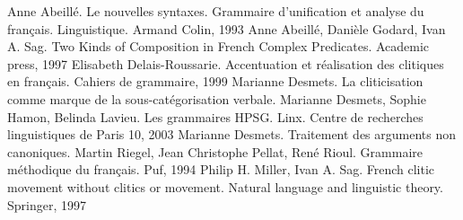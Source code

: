 \begin{thebibliography}{}

\bibitem[Abe93]{} Anne Abeillé. Le nouvelles syntaxes. Grammaire d'unification et analyse du français. Linguistique. Armand Colin, 1993
\bibitem[Abe97]{} Anne Abeillé, Danièle Godard, Ivan A. Sag. Two Kinds of Composition in French Complex Predicates. Academic press, 1997
\bibitem[Del99]{} Elisabeth Delais-Roussarie. Accentuation et réalisation des clitiques en français. Cahiers de grammaire, 1999
\bibitem[DesC]{} Marianne Desmets. La cliticisation comme marque de la sous-catégorisation verbale.
\bibitem[Des03]{} Marianne Desmets, Sophie Hamon, Belinda Lavieu. Les grammaires HPSG. Linx. Centre de recherches linguistiques de Paris 10, 2003
\bibitem[DesT]{} Marianne Desmets. Traitement des arguments non canoniques.
\bibitem[Rie94]{} Martin Riegel, Jean Christophe Pellat, René Rioul. Grammaire méthodique du français. Puf, 1994
\bibitem[Mil97]{} Philip H. Miller, Ivan A. Sag. French clitic movement without clitics or movement. Natural language and linguistic theory. Springer, 1997

\end{thebibliography}
